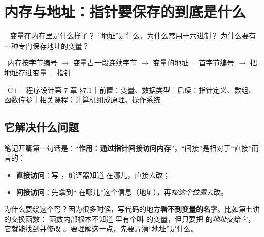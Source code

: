 
\section{内存与地址：指针要保存的到底是什么}\label{sec:mem}
\  变量在内存里是什么样子？ “地址”是什么，为什么常用十六进制？ 为什么要有一种专门保存地址的变量？\par
{}\ 内存按字节编号 $\to$ 变量占一段连续字节 $\to$ 变量的地址 = 首字节编号 $\to$ 把地址存进变量 = 指针\par
{}\ C++ 程序设计第 7 章 §7.1｜前置：变量、数据类型｜后续：指针定义、数组、函数传参｜相关课程：计算机组成原理、操作系统

\subsection{它解决什么问题}
笔记开篇第一句话是：“\textbf{作用：通过指针间接访问内存}”。“间接”是相对于“直接”而言的：

\begin{itemize}
  \item \textbf{直接访问}：写 ，编译器知道  在哪儿，直接去改；
  \item \textbf{间接访问}：先拿到“ 在哪儿”这个信息（地址），再\emph{按这个位置}去改。
\end{itemize}
为什么要绕这个弯？因为很多时候，写代码的地方\textbf{看不到变量的名字}。比如第七讲的交换函数： 函数内部根本不知道  里有个叫  的变量，但只要把  的\emph{地址}交给它，它就能找到并修改 。要理解这一点，先要弄清“地址”是什么。

